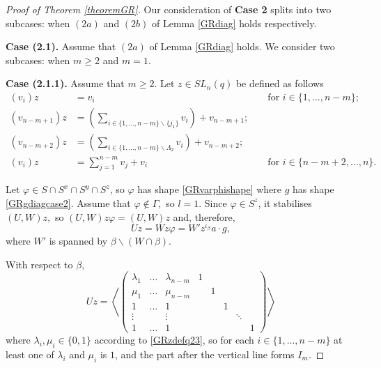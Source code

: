 \begin{proof}[Proof of Theorem {\rm \ref{theoremGR}}]
 Our consideration of {\bf Case 2} splits into two subcases: when $(2a)$ and $(2b)$ of Lemma \ref{GRdiag} holds respectively.

\medskip

{\bf Case (2.1).} Assume that $(2a)$ of Lemma \ref{GRdiag} holds. We consider two subcases: when $m \ge 2$ and $m=1$.

{\bf Case (2.1.1).} Assume that $m \ge 2.$ Let $z \in SL_n(q)$ be defined as follows
\begin{equation}
\label{GRzdefq23}
\begin{aligned}
(v_i)z & =  v_i &&\text{ for } i \in \{1, \ldots, n-m\}; \\
(v_{n-m+1})z & =  \left(\underset{i \in \{1, \ldots, n-m\} \backslash \{j_1\}}{\sum} v_i \right) + v_{n-m+1};\\
(v_{n-m+2})z & =  \left(\underset{i \in \{1, \ldots, n-m\} \backslash \Lambda_2}{\sum} v_i \right)   + v_{n-m+2};\\
(v_i)z & =  \sum_{j=1}^{n-m} v_{j} + v_{i} && \text{ for } i \in \{n-m+2, \ldots, n\}.
\end{aligned} 
\end{equation}

Let $\varphi \in S \cap S^x \cap S^y \cap S^z$, so $\varphi$ has shape \eqref{GRvarphishape} where $g$ has shape \eqref{GRgdiagcase2}.   Assume that $\varphi \notin \Gamma,$ so $l=1.$ Since $\varphi \in S^z$, it stabilises $(U,W)z,$ so $(U,W)z \varphi =(U,W)z$ and, therefore, 
$$Uz=Wz \varphi = W'z^{\iota_{\beta}}a \cdot g,$$
where $W'$ is spanned by $\beta \backslash (W \cap \beta).$  

 With respect to $\beta$,
$$Uz= \left \langle 
\left(\begin{array}{ccc|ccccc}
\lambda_1 & \ldots & \lambda_{n-m}   &           1 & & & & \\
\mu_1     & \ldots & \mu_{n-m}       &           & 1 & & & \\
  1       & \ldots &  1              &           &   &1 & &  \\
\vdots    &        &\vdots           &           &  & &\ddots & \\
1         & \ldots &  1              &           &  & & & 1 
\end{array}\right)
\right \rangle$$
where $\lambda_i, \mu_i \in \{0,1\}$ according to \eqref{GRzdefq23}, so for each $i \in \{1, \ldots, n-m\}$ at least one of $\lambda_i$ and $\mu_i$ is $1$,  and the part after the vertical line forms $I_m.$


\end{proof}
